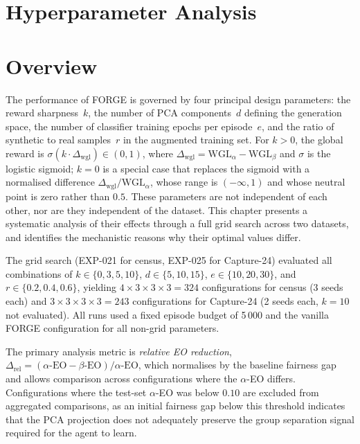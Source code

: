 \documentclass[12pt]{article}
\begin{document}

\section{Hyperparameter Analysis}
\label{ch:grid}

\section{Overview}

The performance of FORGE is governed by four principal design parameters:
the reward sharpness~$k$, the number of PCA components~$d$ defining the
generation space, the number of classifier training epochs per episode~$e$,
and the ratio of synthetic to real samples~$r$ in the augmented training set.
For $k > 0$, the global reward is $\sigma(k \cdot \Delta_\text{wgl}) \in (0,1)$,
where $\Delta_\text{wgl} = \text{WGL}_\alpha - \text{WGL}_\beta$ and $\sigma$
is the logistic sigmoid; $k=0$ is a special case that replaces the sigmoid
with a normalised difference $\Delta_\text{wgl} / \text{WGL}_\alpha$, whose
range is $(-\infty, 1)$ and whose neutral point is zero rather than $0.5$.
These parameters are not independent of each other, nor are they independent
of the dataset.
This chapter presents a systematic analysis of their effects through a
full grid search across two datasets, and identifies the mechanistic reasons
why their optimal values differ.

The grid search (EXP-021 for census, EXP-025 for Capture-24) evaluated
all combinations of $k \in \{0, 3, 5, 10\}$,
$d \in \{5, 10, 15\}$,
$e \in \{10, 20, 30\}$, and
$r \in \{0.2, 0.4, 0.6\}$,
yielding $4 \times 3 \times 3 \times 3 = 324$ configurations for census
(3 seeds each) and $3 \times 3 \times 3 \times 3 = 243$ configurations
for Capture-24 (2 seeds each, $k=10$ not evaluated).
All runs used a fixed episode budget of 5\,000 and the vanilla FORGE
configuration for all non-grid parameters.

The primary analysis metric is \emph{relative EO reduction},
$\Delta_\text{rel} = (\alpha\text{-EO} - \beta\text{-EO}) / \alpha\text{-EO}$,
which normalises by the baseline fairness gap and allows comparison across
configurations where the $\alpha$-EO differs.
Configurations where the test-set $\alpha$-EO was below $0.10$ are excluded
from aggregated comparisons, as an initial fairness gap below this threshold
indicates that the PCA projection does not adequately preserve the group
separation signal required for the agent to learn.
\end{document}

